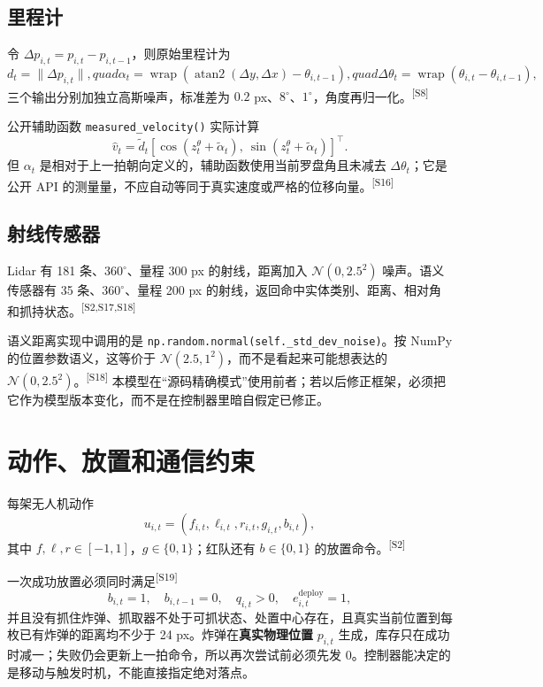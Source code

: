 \documentclass[UTF8,11pt]{ctexart}
\newcommand{\src}[1]{\textsuperscript{\textcolor{blue!65!black}{[#1]}}}
\newcommand{\wrap}{\operatorname{wrap}}
\begin{document}
\subsection{里程计}

令 $\Delta p_{i,t}=p_{i,t}-p_{i,t-1}$，则原始里程计为
\begin{equation}
d_t=\|\Delta p_{i,t}\|,quad
\alpha_t=\wrap(\operatorname{atan2}(\Delta y,\Delta x)-\theta_{i,t-1}),quad
\Delta\theta_t=\wrap(\theta_{i,t}-\theta_{i,t-1}),
\end{equation}
三个输出分别加独立高斯噪声，标准差为 $0.2$ px、$8^\circ$、$1^\circ$，角度再归一化。\src{S8}

公开辅助函数 \texttt{measured\_velocity()} 实际计算
\begin{equation}
\widehat v_t=\tilde d_t[\cos(z^\theta_t+\tilde\alpha_t),\ \sin(z^\theta_t+\tilde\alpha_t)]^\top.
\end{equation}
但 $\alpha_t$ 是相对于上一拍朝向定义的，辅助函数使用当前罗盘角且未减去 $\Delta\theta_t$；它是公开 API 的测量量，不应自动等同于真实速度或严格的位移向量。\src{S16}

\subsection{射线传感器}

Lidar 有 181 条、$360^\circ$、量程 300 px 的射线，距离加入 $\mathcal N(0,2.5^2)$ 噪声。语义传感器有 35 条、$360^\circ$、量程 200 px 的射线，返回命中实体类别、距离、相对角和抓持状态。\src{S2,S17,S18}

语义距离实现中调用的是 \texttt{np.random.normal(self.\_std\_dev\_noise)}。按 NumPy 的位置参数语义，这等价于 $\mathcal N(2.5,1^2)$，而不是看起来可能想表达的 $\mathcal N(0,2.5^2)$。\src{S18} 本模型在“源码精确模式”使用前者；若以后修正框架，必须把它作为模型版本变化，而不是在控制器里暗自假定已修正。

\section{动作、放置和通信约束}

每架无人机动作
\begin{equation}
u_{i,t}=(f_{i,t},\ell_{i,t},r_{i,t},g_{i,t},b_{i,t}),
\end{equation}
其中 $f,\ell,r\in[-1,1]$，$g\in\{0,1\}$；红队还有 $b\in\{0,1\}$ 的放置命令。\src{S2}

一次成功放置必须同时满足\src{S19}
\begin{equation}
b_{i,t}=1,\quad b_{i,t-1}=0,\quad q_{i,t}>0,\quad e^{\mathrm{deploy}}_{i,t}=1,
\end{equation}
并且没有抓住炸弹、抓取器不处于可抓状态、处置中心存在，且真实当前位置到每枚已有炸弹的距离均不少于 24 px。炸弹在\textbf{真实物理位置} $p_{i,t}$ 生成，库存只在成功时减一；失败仍会更新上一拍命令，所以再次尝试前必须先发 0。控制器能决定的是移动与触发时机，不能直接指定绝对落点。
\end{document}

